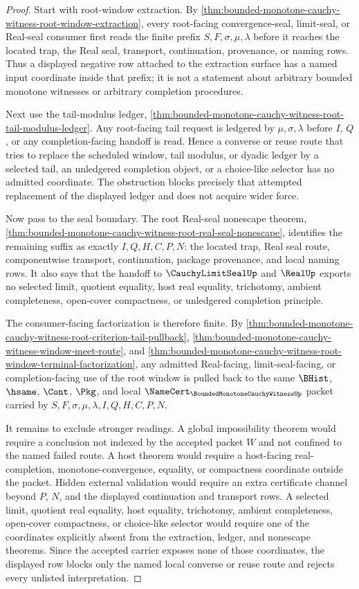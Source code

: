 \begin{proof}
Start with root-window extraction. By \autoref{thm:bounded-monotone-cauchy-witness-root-window-extraction}, every root-facing convergence-seal, limit-seal, or Real-seal consumer first reads the finite prefix $S,F,\sigma,\mu,\lambda$ before it reaches the located trap, the Real seal, transport, continuation, provenance, or naming rows. Thus a displayed negative row attached to the extraction surface has a named input coordinate inside that prefix; it is not a statement about arbitrary bounded monotone witnesses or arbitrary completion procedures.

Next use the tail-modulus ledger, \autoref{thm:bounded-monotone-cauchy-witness-root-tail-modulus-ledger}. Any root-facing tail request is ledgered by $\mu,\sigma,\lambda$ before $I$, $Q$, or any completion-facing handoff is read. Hence a converse or reuse route that tries to replace the scheduled window, tail modulus, or dyadic ledger by a selected tail, an unledgered completion object, or a choice-like selector has no admitted coordinate. The obstruction blocks precisely that attempted replacement of the displayed ledger and does not acquire wider force.

Now pass to the seal boundary. The root Real-seal nonescape theorem, \autoref{thm:bounded-monotone-cauchy-witness-root-real-seal-nonescape}, identifies the remaining suffix as exactly $I,Q,H,C,P,N$: the located trap, Real seal route, componentwise transport, continuation, package provenance, and local naming rows. It also says that the handoff to $\CauchyLimitSealUp$ and $\RealUp$ exports no selected limit, quotient equality, host real equality, trichotomy, ambient completeness, open-cover compactness, or unledgered completion principle.

The consumer-facing factorization is therefore finite. By \autoref{thm:bounded-monotone-cauchy-witness-root-criterion-tail-pullback}, \autoref{thm:bounded-monotone-cauchy-witness-window-meet-route}, and \autoref{thm:bounded-monotone-cauchy-witness-root-window-terminal-factorization}, any admitted Real-facing, limit-seal-facing, or completion-facing use of the root window is pulled back to the same $\BHist$, $\hsame$, $\Cont$, $\Pkg$, and local $\NameCert_{\BoundedMonotoneCauchyWitnessUp}$ packet carried by $S,F,\sigma,\mu,\lambda,I,Q,H,C,P,N$.

It remains to exclude stronger readings. A global impossibility theorem would require a conclusion not indexed by the accepted packet $W$ and not confined to the named failed route. A host theorem would require a host-facing real-completion, monotone-convergence, equality, or compactness coordinate outside the packet. Hidden external validation would require an extra certificate channel beyond $P$, $N$, and the displayed continuation and transport rows. A selected limit, quotient real equality, host equality, trichotomy, ambient completeness, open-cover compactness, or choice-like selector would require one of the coordinates explicitly absent from the extraction, ledger, and nonescape theorems. Since the accepted carrier exposes none of those coordinates, the displayed row blocks only the named local converse or reuse route and rejects every unlisted interpretation.
\end{proof}
